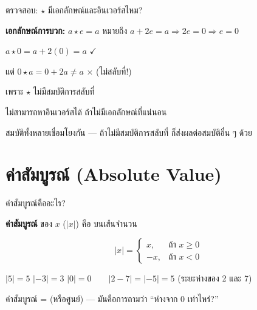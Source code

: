 \documentclass[11pt, aspectratio=169]{beamer}
\begin{document}
\begin{frame}{ตรวจสอบ: $\star$ มีเอกลักษณ์และอินเวอร์สไหม?}
  \begin{exambox}
    \textbf{เอกลักษณ์การบวก:} $a \star e = a$ หมายถึง $a + 2e = a \Rightarrow 2e = 0 \Rightarrow e = 0$

    $a \star 0 = a + 2(0) = a$ \quad $\checkmark$

    แต่ $0 \star a = 0 + 2a \neq a$ \quad $\times$ \;(ไม่สลับที่!)

    \medskip
     เพราะ $\star$ ไม่มีสมบัติการสลับที่
  \end{exambox}

  \begin{exambox}
    ไม่สามารถหาอินเวอร์สได้ ถ้าไม่มีเอกลักษณ์ที่แน่นอน

    \medskip
     สมบัติทั้งหลายเชื่อมโยงกัน —
    ถ้าไม่มีสมบัติการสลับที่ ก็ส่งผลต่อสมบัติอื่น ๆ ด้วย
  \end{exambox}
\end{frame}

\section{ค่าสัมบูรณ์ (Absolute Value)}

\begin{frame}{ค่าสัมบูรณ์คืออะไร?}
  \begin{explanation}[นิยาม]
    \textbf{ค่าสัมบูรณ์} ของ $x$ ($|x|$) คือ  บนเส้นจำนวน

    \[
      |x| =
      \begin{cases}
        x,  & \text{ถ้า } x \geq 0 \\
        -x, & \text{ถ้า } x < 0
      \end{cases}
    \]
  \end{explanation}

  \begin{exambox}[ตัวอย่าง]
    $|5| = 5$ \qquad $|-3| = 3$ \qquad $|0| = 0\qquad |2 - 7| = |-5| = 5$ \quad (ระยะห่างของ 2 และ 7)
  \end{exambox}

  \begin{intuition}[คิดง่าย ๆ]
    ค่าสัมบูรณ์ =  (หรือศูนย์)
    — มันคือการถามว่า ``ห่างจาก 0 เท่าไหร่?''
  \end{intuition}
\end{frame}
\end{document}
